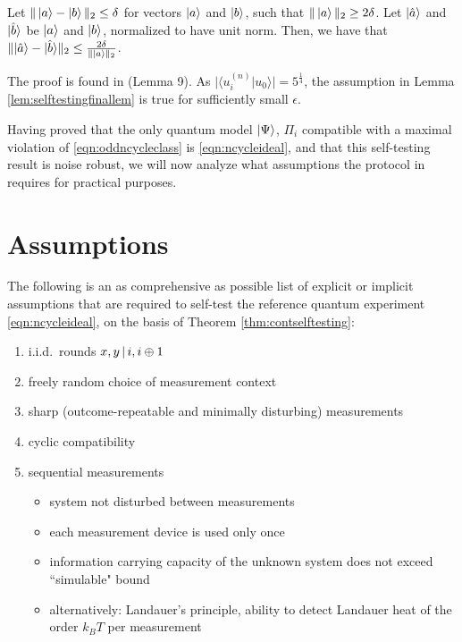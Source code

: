 \begin{lemma}
\label{lem:selftestingfinallem}
Let $\| \ket{a} - \ket{b} \|_2\leq\delta$ for vectors $\ket{a}$ and $\ket{b}$, such that $\|\ket{a}\|_2\geq2\delta$. Let $\vert \Hat{a} \rangle$ and $\vert \Hat{b} \rangle$ be $\ket{a}$ and $\ket{b}$, normalized to have unit norm. Then, we have that $\| \vert \Hat{a}\rangle-\vert \Hat{b} \rangle \|_2\leq \frac{2\delta}{\|\ket{a}\|_2}$.
\end{lemma}
The proof is found in \cite{Bharti2019} (Lemma 9). As $\vert \langle u_i^{(n)}\vert u_0 \rangle \vert =5^{\frac{1}{4}}$, the assumption in Lemma \ref{lem:selftestingfinallem} is true for sufficiently small $\epsilon$.

Having proved that the only quantum model $\ket{\Psi}$, $\Pi_i$ compatible with a maximal violation of \ref{eqn:oddncycleclass} is \ref{eqn:ncycleideal}, and that this self-testing result is noise robust, we will now analyze what assumptions the protocol in \cite{Bharti2019} requires for practical purposes.

\section{Assumptions}
\label{sec:kscontass}
The following is an as comprehensive as possible list of explicit or implicit assumptions that are required to self-test the reference quantum experiment \ref{eqn:ncycleideal}, on the basis of Theorem \ref{thm:contselftesting}:
\begin{enumerate}
    \item i.i.d.\ rounds $x,y \thinspace\vert\thinspace i,i\oplus 1$
    \item freely random choice of measurement context
    \item sharp (outcome-repeatable and minimally disturbing) measurements 
    \item cyclic compatibility
    \item sequential measurements
    \begin{itemize}
        \item system not disturbed between measurements
        \item each measurement device is used only once
        \item information carrying capacity of the unknown system does not exceed ``simulable" bound
        \item alternatively: Landauer's principle, ability to detect Landauer heat of the order $k_B T$ per measurement
    \end{itemize}
\end{enumerate}

